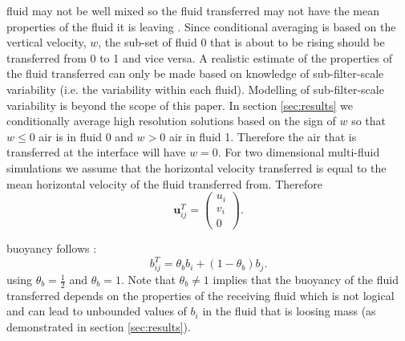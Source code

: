 \documentclass[draft]{agujournal2019}
\begin{document}
 fluid may not be well mixed so the fluid transferred
may not have the mean properties of the fluid it is leaving \cite<as was assumed by>{WM19}. 
{Since conditional averaging is based on the vertical velocity, $w$, the sub-set of fluid 0 that is about to be rising}
should be transferred from 0 to 1 and vice versa.
{A realistic estimate of the properties of the fluid transferred can only be made based on knowledge of sub-filter-scale variability (i.e. the variability within each fluid). Modelling of sub-filter-scale variability}
is beyond the scope of this paper.
%
In section \ref{sec:results}
we conditionally average high resolution solutions based on the sign
of $w$ so that $w\le 0$ air is in fluid 0 and $w>0$ air in fluid 1.
Therefore the air that is transferred at the interface will have $w=0$.
For two dimensional multi-fluid simulations we  assume that the horizontal
velocity transferred is equal to the mean horizontal velocity of the
fluid transferred from. Therefore
\begin{equation}
\mathbf{u}_{ij}^{T}=\begin{pmatrix}u_{i}\\
v_{i}\\
0
\end{pmatrix}.
\end{equation}

 buoyancy  follows : 
\begin{equation}
b_{ij}^{T}=\theta_{b}b_{i}+(1-\theta_{b})b_{j}.
\label{eq:bijT_thetab}
\end{equation}
 using $\theta_{b}=\frac{1}{2}$ and $\theta_{b}=1$.
Note that $\theta_{b}\ne1$ implies that the buoyancy of the fluid
transferred depends on the properties of the receiving fluid which
is not logical and can lead to unbounded values of $b_{i}$ in the
fluid that is loosing mass (as demonstrated in section \ref{sec:results}).
\end{document}
